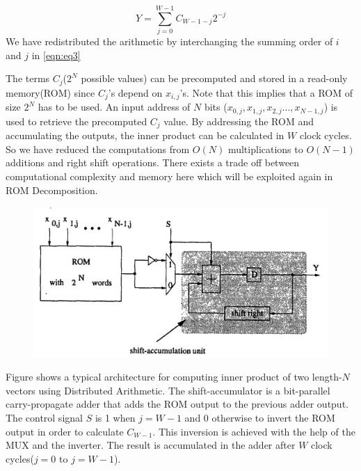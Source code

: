 \begin{equation}
Y = \sum_{j=0}^{W-1} C_{W-1-j}2^{-j}
\end{equation}
We have redistributed the arithmetic by interchanging the summing order of $i$ and $j$ in \eqref{eqn:eq3}

The terms $C_j$($2^N$ possible values) can be precomputed and stored in a read-only memory(ROM) since $C_j$'s depend on $x_{i,j}$'s. Note that this implies that a ROM of size $2^N$ has to be used.
An input address of $N$ bits ($x_{0,j}, x_{1,j}, x_{2,j} ..., x_{N-1,j}$) is used to retrieve the precomputed $C_j$ value. By addressing the ROM and accumulating the outputs, the inner product can be calculated in $W$ clock cycles.
So we have reduced the computations from $O(N)$ multiplications to $O(N-1)$ additions and right shift operations. There exists a trade off between computational complexity and memory here which will be exploited again in ROM Decomposition.
\begin{figure}[h]
\includegraphics[scale=0.35]{images/da.png}
\end{figure}
Figure %
shows a typical architecture for computing inner product of two length-$N$ vectors using Distributed Arithmetic. The shift-accumulator is a bit-parallel carry-propagate adder that adds the ROM output to the previous adder output. The control signal $S$ is 1 when $j = W-1$ and 0 otherwise to invert the ROM output in order to calculate $C_{W-1}$. This inversion is achieved with the help of the MUX and the inverter. The result is accumulated in the adder after $W$ clock cycles($j=0$ to $j=W-1$).

